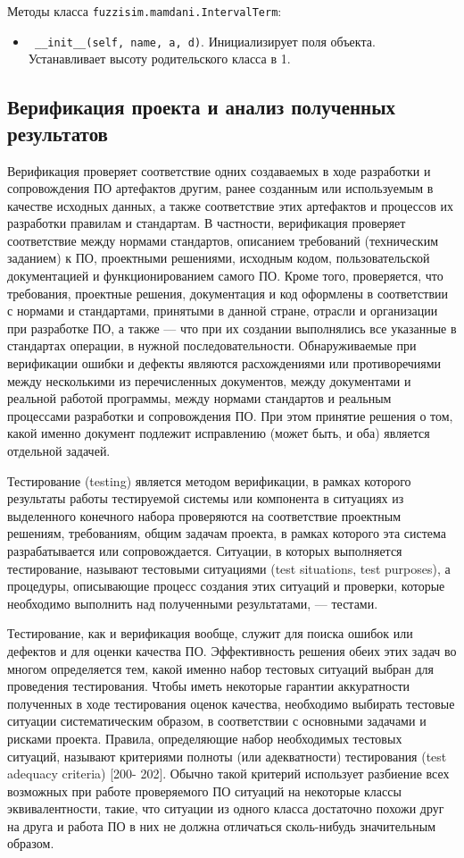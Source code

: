 Методы класса \lstinline!fuzzisim.mamdani.IntervalTerm!:
\begin{itemize}
	\item \lstinline! __init__(self, name, a, d)!. Инициализирует поля объекта.  Устанавливает высоту родительского класса в 1.
\end{itemize}

\subsection{Верификация проекта и анализ полученных результатов}

Верификация проверяет соответствие одних создаваемых в ходе разработки и сопровождения ПО артефактов другим, ранее созданным или используемым в качестве исходных данных, а также соответствие этих артефактов и процессов их разработки правилам и стандартам. В частности, верификация проверяет соответствие между нормами стандартов, описанием требований (техническим заданием) к ПО, проектными решениями, исходным кодом, пользовательской документацией и функционированием самого ПО. Кроме того, проверяется, что требования, проектные решения, документация и код оформлены в соответствии с нормами и стандартами, принятыми в данной стране, отрасли и организации при разработке ПО, а также — что при их создании выполнялись все указанные в стандартах операции, в нужной последовательности. Обнаруживаемые при верификации ошибки и дефекты являются расхождениями или противоречиями между несколькими из перечисленных документов, между документами и реальной работой программы, между нормами стандартов и реальным процессами разработки и сопровождения ПО. При этом принятие решения о том, какой именно документ подлежит исправлению (может быть, и оба) является отдельной задачей.

Тестирование (testing) является методом верификации, в рамках которого результаты работы тестируемой системы или компонента в ситуациях из выделенного конечного набора проверяются на соответствие проектным решениям, требованиям, общим задачам проекта, в рамках которого эта система разрабатывается или сопровождается. Ситуации, в которых выполняется тестирование, называют тестовыми ситуациями (test situations, test purposes), а процедуры, описывающие процесс создания этих ситуаций и проверки, которые необходимо выполнить над полученными результатами, — тестами.

Тестирование, как и верификация вообще, служит для поиска ошибок или дефектов и для оценки качества ПО. Эффективность решения обеих этих задач во многом определяется тем, какой именно набор тестовых ситуаций выбран для проведения тестирования. Чтобы иметь некоторые гарантии аккуратности полученных в ходе тестирования оценок качества, необходимо выбирать тестовые ситуации систематическим образом, в соответствии с основными задачами и рисками проекта. Правила, определяющие набор необходимых тестовых ситуаций, называют критериями полноты (или адекватности) тестирования (test adequacy criteria) [200- 202]. Обычно такой критерий использует разбиение всех возможных при работе проверяемого ПО ситуаций на некоторые классы эквивалентности, такие, что ситуации из одного класса достаточно похожи друг на друга и работа ПО в них не должна отличаться сколь-нибудь значительным образом.

